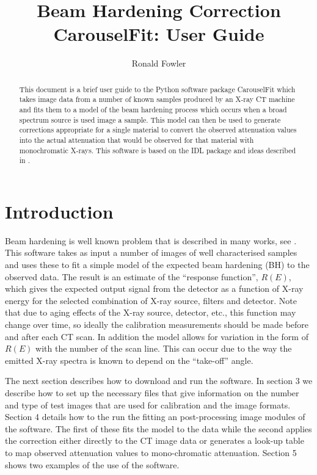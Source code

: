 \documentclass[a4paper]{article}
\begin{document}
\title{Beam Hardening Correction CarouselFit: User Guide}
\author{Ronald Fowler}

\maketitle

\begin{abstract}
This document is a brief user guide to the Python software package CarouselFit which takes image
data from a number of known samples produced by an X-ray CT machine and fits them to a model of
the beam hardening process which occurs when a broad spectrum source is used image a sample.
This model can then be used to generate corrections appropriate for a single material to convert
the observed attenuation values into the actual attenuation that would be observed for that material
with monochromatic X-rays.
This software is based on the IDL package and ideas described in \cite{davis}.
\end{abstract}

\section{Introduction}
Beam hardening is well known problem that is described in many works, see \cite{davis}.
This software takes as input a number of images of well characterised samples and uses these
to fit a simple model of the expected beam hardening (BH) to the observed data.
The result is an estimate of the ``response function'', $R(E)$, which gives the expected output signal
from the detector as a function of X-ray energy for the selected combination of X-ray source, filters
and detector.
Note that due to aging effects of the X-ray source, detector, etc., this function may change over time,
so ideally the calibration measurements should be made before and after each CT scan.
In addition the model allows for variation in the form of $R(E)$ with the number of the scan line.
This can occur due to the way the emitted X-ray spectra is known to depend on the ``take-off'' angle.

The next section describes how to download and run the software.
In section 3 we describe how to set up the necessary files that give
information on the number and type of test images that are used for calibration and the
image formats.
Section 4 details how to the run the fitting an post-processing image modules of the software.
The first of these fits the model to the data while the second applies the correction either
directly to the CT image data or generates a look-up table to map observed attenuation values to
mono-chromatic attenuation.
Section 5 shows two examples of the use of the software.
\end{document}
